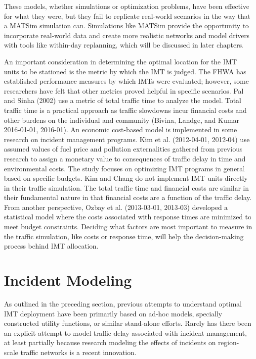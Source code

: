 \documentclass[
  letterpaper,
  DIV=11,
  numbers=noendperiod]{scrreprt}
\begin{document}
These models, whether simulations or optimization problems, have been
effective for what they were, but they fail to replicate real-world
scenarios in the way that a MATSim simulation can. Simulations like
MATSim provide the opportunity to incorporate real-world data and create
more realistic networks and model drivers with tools like within-day
replanning, which will be discussed in later chapters.

An important consideration in determining the optimal location for the
IMT units to be stationed is the metric by which the IMT is judged. The
FHWA has established performance measures by which IMTs were evaluated;
however, some researchers have felt that other metrics proved helpful in
specific scenarios. Pal and Sinha (2002) use a metric of total traffic
time to analyze the model. Total traffic time is a practical approach as
traffic slowdowns incur financial costs and other burdens on the
individual and community (Bivina, Landge, and Kumar 2016-01-01,
2016-01). An economic cost-based model is implemented in some research
on incident management programs. Kim et al. (2012-04-01, 2012-04) use
assumed values of fuel price and pollution externalities gathered from
previous research to assign a monetary value to consequences of traffic
delay in time and environmental costs. The study focuses on optimizing
IMT programs in general based on specific budgets. Kim and Chang do not
implement IMT units directly in their traffic simulation. The total
traffic time and financial costs are similar in their fundamental nature
in that financial costs are a function of the traffic delay. From
another perspective, Ozbay et al. (2013-03-01, 2013-03) developed a
statistical model where the costs associated with response times are
minimized to meet budget constraints. Deciding what factors are most
important to measure in the traffic simulation, like costs or response
time, will help the decision-making process behind IMT allocation.

\hypertarget{incident-modeling}{%
\section{Incident Modeling}\label{incident-modeling}}

As outlined in the preceding section, previous attempts to understand
optimal IMT deployment have been primarily based on ad-hoc models,
specially constructed utility functions, or similar stand-alone efforts.
Rarely has there been an explicit attempt to model traffic delay
associated with incident management, at least partially because research
modeling the effects of incidents on region-scale traffic networks is a
recent innovation.
\end{document}

